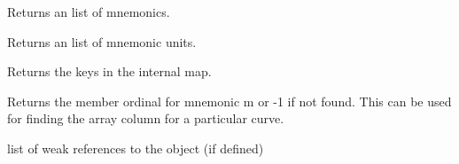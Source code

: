 \documentclass[letterpaper,10pt,english]{sphinxmanual}
\begin{document}
\begin{fulllineitems}
\begin{fulllineitems}
\end{fulllineitems}


\begin{fulllineitems}
\label{\detokenize{ref/LAS/core/LASRead:TotalDepth.LAS.core.LASRead.LASSection.mnemS}}
Returns an list of mnemonics.

\end{fulllineitems}


\begin{fulllineitems}
\label{\detokenize{ref/LAS/core/LASRead:TotalDepth.LAS.core.LASRead.LASSection.unitS}}
Returns an list of mnemonic units.

\end{fulllineitems}


\begin{fulllineitems}
\label{\detokenize{ref/LAS/core/LASRead:TotalDepth.LAS.core.LASRead.LASSection.keys}}
Returns the keys in the internal map.

\end{fulllineitems}


\begin{fulllineitems}
\label{\detokenize{ref/LAS/core/LASRead:TotalDepth.LAS.core.LASRead.LASSection.find}}
Returns the member ordinal for mnemonic m or -1 if not found.
This can be used for finding the array column for a particular curve.

\end{fulllineitems}


\begin{fulllineitems}
\label{\detokenize{ref/LAS/core/LASRead:TotalDepth.LAS.core.LASRead.LASSection.__weakref__}}
list of weak references to the object (if defined)

\end{fulllineitems}


\end{fulllineitems}
\end{document}
